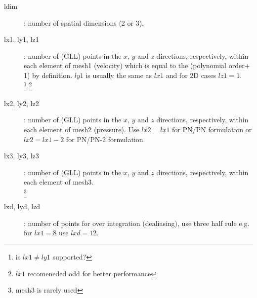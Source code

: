 

\begin{description}
\item [ldim]: number of spatial dimensions (2 or 3).%
\item [lx1, ly1, lz1]: number of (GLL) points in the \(x\), \(y\) and \(z\) directions, respectively, within each element of mesh1 (velocity) which is equal to the (polynomial order\(+\)1) by definition. \(ly1\) is usually the same as \(lx1\) and for 2D cases \(lz1=1\). \\
\footnote{is \(lx1\ne ly1\) supported?}
\footnote{\(lx1\) recomeneded odd for better performance}
\item [lx2, ly2, lz2]: number of (GLL) points in the \(x\), \(y\) and \(z\) directions, respectively, within each element of mesh2 (pressure). Use \(lx2=lx1\) for PN/PN formulation or \(lx2=lx1-2\) for PN/PN-2 formulation.
\item [lx3, ly3, lz3]: number of (GLL) points in the \(x\), \(y\) and \(z\) directions, respectively, within each element of mesh3.\\
\footnote{mesh3 is rarely used}
\item [lxd, lyd, lzd]: number of points for over integration (dealiasing), use three half rule e.g. for \(lx1=8\) use \(lxd=12\).\\


\end{description}
